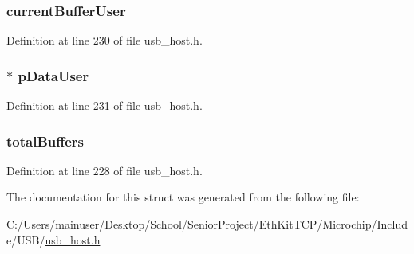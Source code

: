 \subsubsection[{current\+Buffer\+User}]{ current\+Buffer\+User}\label{struct___i_s_o_c_h_r_o_n_o_u_s___d_a_t_a_ad258467ab8b17ad8fc19a302634e557d}


Definition at line 230 of file usb\+\_\+host.\+h.

\hypertarget{struct___i_s_o_c_h_r_o_n_o_u_s___d_a_t_a_a09efb3681b1904bc67b29f57b3c2b710}{}
\subsubsection[{p\+Data\+User}]{$\ast$ p\+Data\+User}\label{struct___i_s_o_c_h_r_o_n_o_u_s___d_a_t_a_a09efb3681b1904bc67b29f57b3c2b710}


Definition at line 231 of file usb\+\_\+host.\+h.

\hypertarget{struct___i_s_o_c_h_r_o_n_o_u_s___d_a_t_a_ab474d2e9b1275ded10e8c5f45e856fdc}{}
\subsubsection[{total\+Buffers}]{ total\+Buffers}\label{struct___i_s_o_c_h_r_o_n_o_u_s___d_a_t_a_ab474d2e9b1275ded10e8c5f45e856fdc}


Definition at line 228 of file usb\+\_\+host.\+h.



The documentation for this struct was generated from the following file\+:\begin{DoxyCompactItemize}
\item 
C\+:/\+Users/mainuser/\+Desktop/\+School/\+Senior\+Project/\+Eth\+Kit\+T\+C\+P/\+Microchip/\+Include/\+U\+S\+B/\hyperlink{usb__host_8h}{usb\+\_\+host.\+h}\end{DoxyCompactItemize}
